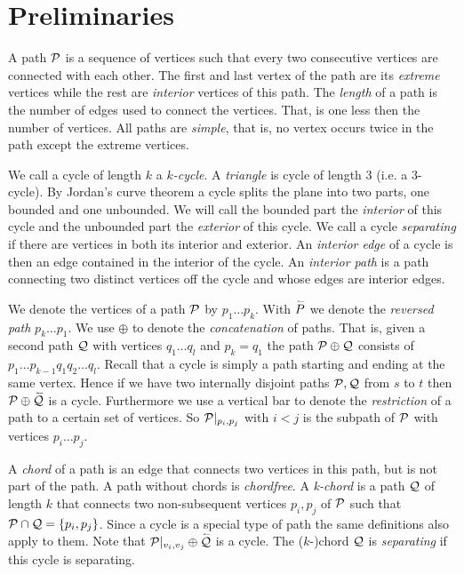 
\section{Preliminaries}

  A path $\P$ is a sequence of vertices such that every two consecutive vertices are connected with each other. The first and last vertex of the path are its \emph{extreme} vertices while the rest are \emph{interior} vertices of this path. The \emph{length} of a path is the number of edges used to connect the vertices. That, is one less then the number of vertices. All paths are \emph{simple}, that is, no vertex occurs twice in the path except the extreme vertices.

  We call a cycle of length $k$  a \emph{$k$-cycle}. A \emph{triangle} is cycle of length $3$ (i.e. a $3$-cycle).
  By Jordan's curve theorem a cycle splits the plane into two parts, one bounded and one unbounded. We will call the bounded part the \emph{interior} of this cycle and the unbounded part the \emph{exterior} of this cycle.
  We call a cycle \emph{separating} if there are vertices in both its interior and exterior.
  An \emph{interior edge} of a cycle is then an edge contained in the interior of the cycle.
  An \emph{interior path} is a path connecting two distinct vertices off the cycle and whose edges are interior edges.

  We denote the vertices of a path $\P$ by $p_1 \ldots p_k$.
  With $\rev{P}$ we denote the \emph{reversed path} $p_k \ldots p_1$. We use $\oplus$ to denote the \emph{concatenation} of paths. That is, given a second path $\Q$ with vertices $q_1 \ldots q_l$ and $p_k = q_1$ the path $\P \oplus \Q$ consists of $p_1 \ldots p_{k-1} q_1 q_2 \ldots q_l$.
  Recall that a cycle is simply a path starting and ending at the same vertex. Hence if we have two  internally disjoint paths $\P, \Q$ from $s$ to $t$ then $\P \oplus \rev{\Q}$ is a cycle.
  Furthermore we use a vertical bar to denote the \emph{restriction} of a path to a certain set of vertices. So $\P|_{p_i, p_j}$ with $i<j$ is the subpath of $\P$ with vertices $p_i \ldots p_j$.

  A \emph{chord} of a path is an edge that connects two vertices in this path, but is not part of the path. A path without chords is \emph{chordfree}.
  A \emph{k-chord} is a path $\Q$ of length $k$ that connects two non-subsequent vertices $p_i, p_j$ of $\P$ such that $\P \cap \Q = \braces{p_i, p_j}$.
  Since a cycle is a special type of path the same definitions also apply to them.
  Note that $\P|_{v_i, v_j} \oplus \rev{\Q}$ is a cycle. The ($k$-)chord $\Q$ is \emph{separating} if this cycle is separating.

